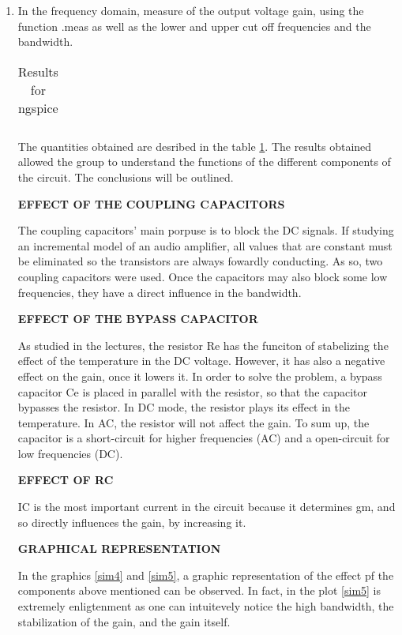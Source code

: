 \begin{enumerate}
     
  
\item  In the frequency domain, measure of the output voltage gain, using the function .meas as well as the lower and upper cut off frequencies and the bandwidth.


\begin{table}[ht]
  \centering
  \begin{tabular}{|l|r|}
    \hline    
   
    \end{tabular}
  \caption{Results for ngspice}
    \label{tab:results}
\end{table}


The quantities obtained are desribed in the table \ref{tab:results}. The results obtained allowed the group to understand the functions of the different components of the circuit. 
The conclusions will be outlined.


 \textbf{EFFECT OF THE COUPLING CAPACITORS}

The coupling capacitors' main porpuse is to block the DC signals. If studying an incremental model of an audio amplifier, all values that are constant must be eliminated so the transistors are always fowardly conducting. As so, two coupling capacitors were used. Once the capacitors may also block some low frequencies, they have a direct influence in the bandwidth.


 \textbf{EFFECT OF THE BYPASS CAPACITOR}
 
  As studied in the lectures, the resistor Re has the funciton of stabelizing the effect of the temperature in the DC voltage. However, it has also a negative effect on the gain, once it lowers it. In order to solve the problem, a bypass capacitor Ce is placed in parallel with the resistor, so that the capacitor bypasses the resistor. In DC mode, the resistor plays its effect in the temperature. In AC, the resistor will not affect the gain. To sum up, the capacitor is a short-circuit for higher frequencies (AC) and a open-circuit for low frequencies (DC).


 \textbf{EFFECT OF RC}
 
IC is the most important current in the circuit because it determines gm, and so directly influences the gain, by increasing it.

\textbf{GRAPHICAL REPRESENTATION}

In the graphics \ref{sim4} and \ref{sim5}, a graphic representation of the effect pf the components above mentioned can be observed. In fact, in the plot \ref{sim5} is extremely enligtenment as one can intuitevely notice the high bandwidth, the stabilization of the gain, and the gain itself.



\end{enumerate}
